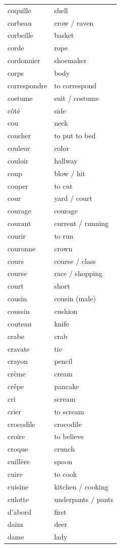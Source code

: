 \documentclass[12pt,a4paper]{article}
\begin{document}
\begin{longtable}{p{4cm} p{6cm}}
coquille & shell \\
corbeau & crow / raven \\
corbeille & basket \\
corde & rope \\
cordonnier & shoemaker \\
corps & body \\
correspondre & to correspond \\
costume & suit / costume \\
côté & side \\
cou & neck \\
coucher & to put to bed \\
couleur & color \\
couloir & hallway \\
coup & blow / hit \\
couper & to cut \\
cour & yard / court \\
courage & courage \\
courant & current / running \\
courir & to run \\
couronne & crown \\
cours & course / class \\
course & race / shopping \\
court & short \\
cousin & cousin (male) \\
coussin & cushion \\
couteau & knife \\
crabe & crab \\
cravate & tie \\
crayon & pencil \\
crème & cream \\
crêpe & pancake \\
cri & scream \\
crier & to scream \\
crocodile & crocodile \\
croire & to believe \\
croque & crunch \\
cuillère & spoon \\
cuire & to cook \\
cuisine & kitchen / cooking \\
culotte & underpants / pants \\
d'abord & first \\
daim & deer \\
dame & lady \\

\end{longtable}
\end{document}
